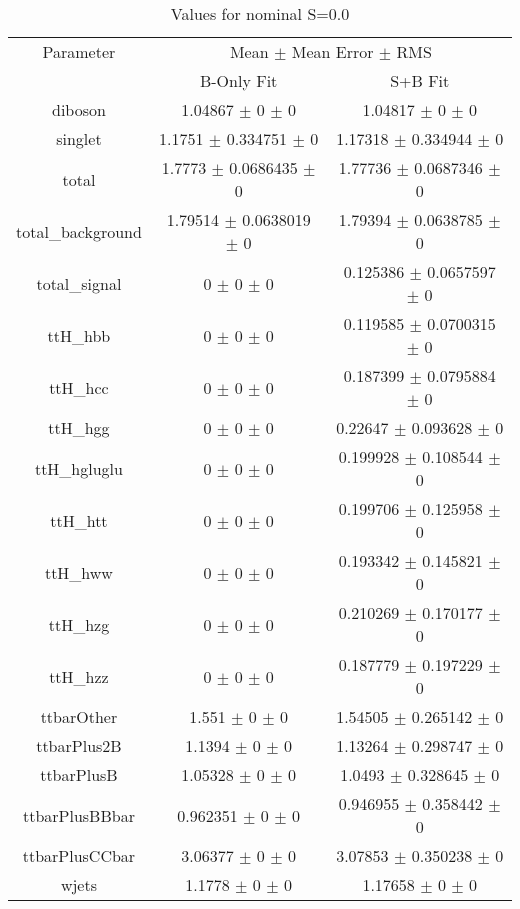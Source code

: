 \begin{table}
\centering
\caption{Values for nominal S=0.0}
\begin{tabular}{ccc}
\toprule
Parameter & \multicolumn{2}{c}{Mean $\pm$ Mean Error $\pm$ RMS}\\
 & B-Only Fit & S+B Fit\\
\midrule
diboson & \num{1.04867} $\pm$ \num{0} $\pm$ \num{0} & \num{1.04817} $\pm$ \num{0} $\pm$ \num{0}\\
singlet & \num{1.1751} $\pm$ \num{0.334751} $\pm$ \num{0} & \num{1.17318} $\pm$ \num{0.334944} $\pm$ \num{0}\\
total & \num{1.7773} $\pm$ \num{0.0686435} $\pm$ \num{0} & \num{1.77736} $\pm$ \num{0.0687346} $\pm$ \num{0}\\
total\_background & \num{1.79514} $\pm$ \num{0.0638019} $\pm$ \num{0} & \num{1.79394} $\pm$ \num{0.0638785} $\pm$ \num{0}\\
total\_signal & \num{0} $\pm$ \num{0} $\pm$ \num{0} & \num{0.125386} $\pm$ \num{0.0657597} $\pm$ \num{0}\\
ttH\_hbb & \num{0} $\pm$ \num{0} $\pm$ \num{0} & \num{0.119585} $\pm$ \num{0.0700315} $\pm$ \num{0}\\
ttH\_hcc & \num{0} $\pm$ \num{0} $\pm$ \num{0} & \num{0.187399} $\pm$ \num{0.0795884} $\pm$ \num{0}\\
ttH\_hgg & \num{0} $\pm$ \num{0} $\pm$ \num{0} & \num{0.22647} $\pm$ \num{0.093628} $\pm$ \num{0}\\
ttH\_hgluglu & \num{0} $\pm$ \num{0} $\pm$ \num{0} & \num{0.199928} $\pm$ \num{0.108544} $\pm$ \num{0}\\
ttH\_htt & \num{0} $\pm$ \num{0} $\pm$ \num{0} & \num{0.199706} $\pm$ \num{0.125958} $\pm$ \num{0}\\
ttH\_hww & \num{0} $\pm$ \num{0} $\pm$ \num{0} & \num{0.193342} $\pm$ \num{0.145821} $\pm$ \num{0}\\
ttH\_hzg & \num{0} $\pm$ \num{0} $\pm$ \num{0} & \num{0.210269} $\pm$ \num{0.170177} $\pm$ \num{0}\\
ttH\_hzz & \num{0} $\pm$ \num{0} $\pm$ \num{0} & \num{0.187779} $\pm$ \num{0.197229} $\pm$ \num{0}\\
ttbarOther & \num{1.551} $\pm$ \num{0} $\pm$ \num{0} & \num{1.54505} $\pm$ \num{0.265142} $\pm$ \num{0}\\
ttbarPlus2B & \num{1.1394} $\pm$ \num{0} $\pm$ \num{0} & \num{1.13264} $\pm$ \num{0.298747} $\pm$ \num{0}\\
ttbarPlusB & \num{1.05328} $\pm$ \num{0} $\pm$ \num{0} & \num{1.0493} $\pm$ \num{0.328645} $\pm$ \num{0}\\
ttbarPlusBBbar & \num{0.962351} $\pm$ \num{0} $\pm$ \num{0} & \num{0.946955} $\pm$ \num{0.358442} $\pm$ \num{0}\\
ttbarPlusCCbar & \num{3.06377} $\pm$ \num{0} $\pm$ \num{0} & \num{3.07853} $\pm$ \num{0.350238} $\pm$ \num{0}\\
wjets & \num{1.1778} $\pm$ \num{0} $\pm$ \num{0} & \num{1.17658} $\pm$ \num{0} $\pm$ \num{0}\\
\bottomrule
\end{tabular}
\end{table}